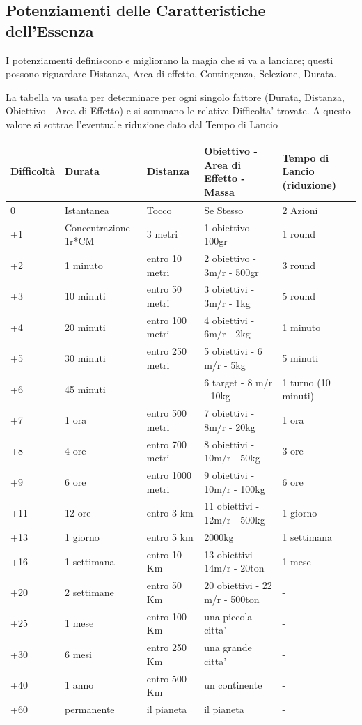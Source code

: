 \documentclass[a4paper,11pt,twoside,openany]{book}
\begin{document}
\subsection{Potenziamenti delle Caratteristiche dell'Essenza}

\label{potenziamenti-delle-caratteristiche-dellessenza}

I potenziamenti definiscono e migliorano la magia che si va a lanciare; questi possono riguardare Distanza, Area di effetto, Contingenza, Selezione, Durata.

La tabella va usata per determinare per ogni singolo fattore (Durata, Distanza, Obiettivo - Area di Effetto) e si sommano le relative Difficolta' trovate.
A questo valore si sottrae l'eventuale riduzione dato dal Tempo di Lancio


\begin{tabularx}{0.95\textwidth}{XXXXX}
	\hline
\textbf{Difficoltà} &\textbf{Durata} &\textbf{Distanza} &\textbf{Obiettivo - Area di Effetto - Massa} &\textbf{Tempo di Lancio (riduzione)} \\
\hline
0	& Istantanea		& Tocco	& Se Stesso& 2 Azioni\\
\hline
+1	& Concentrazione - 1r*CM	& 3 metri& 1 obiettivo - 100gr& 1 round\\
\hline
+2	& 1 minuto	& entro 10 metri&2 obiettivo - 3m/r - 500gr& 3 round\\
\hline
+3	&	10 minuti& entro 50 metri& 3 obiettivi - 3m/r - 1kg& 5 round\\
\hline
+4	& 20 minuti	& entro 100 metri&4 obiettivi - 6m/r - 2kg &1 minuto\\
\hline
+5&30 minuti&entro 250 metri&5 obiettivi - 6 m/r - 5kg &5 minuti\\
\hline
+6&45 minuti&&6 target - 8 m/r - 10kg&1 turno (10 minuti)\\
\hline
+7&1 ora&entro 500 metri&7 obiettivi - 8m/r - 20kg&1 ora\\
\hline
+8&4 ore&entro 700 metri&8 obiettivi - 10m/r - 50kg&3 ore\\
\hline
+9&6 ore&entro 1000 metri&9 obiettivi - 10m/r - 100kg&6 ore\\
\hline	
+11&12 ore&entro 3 km&11 obiettivi - 12m/r - 500kg&1 giorno\\
\hline	
+13&1 giorno&entro 5 km&2000kg&1 settimana\\
\hline	
+16&1 settimana&entro 10 Km&13 obiettivi - 14m/r - 20ton&1 mese\\
\hline	
+20&2 settimane&entro 50 Km&20 obiettivi - 22 m/r - 500ton&-\\
\hline	
+25&1 mese&entro 100 Km&una piccola citta'&-\\
\hline	
+30&6 mesi&entro 250 Km&una grande citta'&-\\
\hline	
+40&1 anno&entro 500 Km&un continente&-\\
\hline	
+60&permanente&il pianeta&il pianeta&-\\
\hline	
\end{tabularx}
\end{document}
